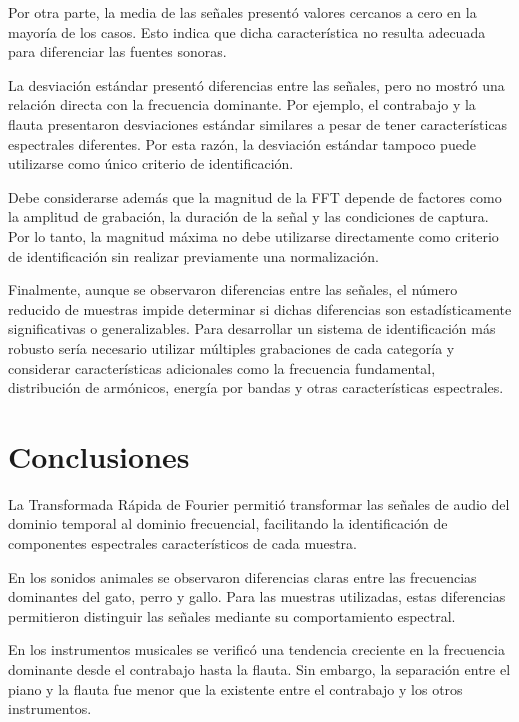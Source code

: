 \documentclass[conference]{IEEEtran}
\begin{document}
Por otra parte, la media de las señales presentó valores cercanos a cero en la mayoría de los casos. Esto indica que dicha característica no resulta adecuada para diferenciar las fuentes sonoras.

La desviación estándar presentó diferencias entre las señales, pero no mostró una relación directa con la frecuencia dominante. Por ejemplo, el contrabajo y la flauta presentaron desviaciones estándar similares a pesar de tener características espectrales diferentes. Por esta razón, la desviación estándar tampoco puede utilizarse como único criterio de identificación.

Debe considerarse además que la magnitud de la FFT depende de factores como la amplitud de grabación, la duración de la señal y las condiciones de captura. Por lo tanto, la magnitud máxima no debe utilizarse directamente como criterio de identificación sin realizar previamente una normalización.

Finalmente, aunque se observaron diferencias entre las señales, el número reducido de muestras impide determinar si dichas diferencias son estadísticamente significativas o generalizables. Para desarrollar un sistema de identificación más robusto sería necesario utilizar múltiples grabaciones de cada categoría y considerar características adicionales como la frecuencia fundamental, distribución de armónicos, energía por bandas y otras características espectrales.



\section{Conclusiones}

La Transformada Rápida de Fourier permitió transformar las señales de audio del dominio temporal al dominio frecuencial, facilitando la identificación de componentes espectrales característicos de cada muestra.

En los sonidos animales se observaron diferencias claras entre las frecuencias dominantes del gato, perro y gallo. Para las muestras utilizadas, estas diferencias permitieron distinguir las señales mediante su comportamiento espectral.

En los instrumentos musicales se verificó una tendencia creciente en la frecuencia dominante desde el contrabajo hasta la flauta. Sin embargo, la separación entre el piano y la flauta fue menor que la existente entre el contrabajo y los otros instrumentos.
\end{document}
